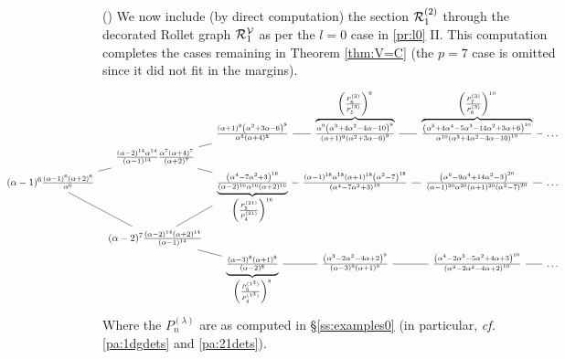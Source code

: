 \documentclass{article}
\newcommand{\ppmm}[1]{#1}  %
\theoremstyle{definition}
\newcommand{\mdef}{\refstepcounter{theorem}       \medskip \noindent ({\bf \thetheorem}) }
\def\a{\alpha}
\def\l{\lambda}
\numberwithin{equation}{subsection}
\begin{document}
\mdef \label{pa:l1}
We now include 
(by direct computation)
the \ppmm{section ${\mathcal{R}}^{(2)}_{1}$ through the }
decorated Rollet graph ${\mathcal{R}}^{{\mathcal V}}_1$ as per the $l=0$ case in \ref{pr:l0} II. This computation completes the cases remaining in Theorem \ref{thm:V=C} (the $p=7$ case is omitted since it did not fit in the margins).
\[
\hspace{-4.51cm} 
\begin{tikzcd}[column sep=0.6em,row sep=0em]
&&&\frac{(\alpha +1)^8 \left(\alpha ^2+3 \alpha -6\right)^8}{\alpha ^8 (\alpha +4)^8}\ar[dash,r]
   &
   \overbrace{
   \tfrac{\alpha ^9 \left(\alpha ^3+4 \alpha ^2-4 \alpha -10\right)^9}{(\alpha +1)^9 \left(\alpha ^2+3 \alpha -6\right)^9}   }^{ \left( \frac{ P^{(3)}_{\ppmm{6}}}{P^{(3)}_{5}} \right)^9}   \ar[dash,r]
   &
   \overbrace{
   \tfrac{\left(\alpha ^5+4 \alpha ^4-5 \alpha ^3-14 \alpha ^2+3 \alpha +6\right)^{10}}{\alpha ^{10} \left(\alpha ^3+4 \alpha ^2-4 \alpha -10\right)^{10}}   }^{  \left( \frac{ P^{(3)}_{\ppmm{7}}}{P^{(3)}_{6}} \right)^{10}  }   \ar[dash,r]
   &\dots
   \\
&&\frac{(\alpha -2)^{14} \alpha ^{14}}{(\alpha -1)^{14}} \frac{\a^7(\alpha +4)^7}{(\alpha +2)^7}\arrow[dash,ur]\arrow[dash,dr]
\\
\alpha ^3\arrow[dash,r] & (\alpha -1)^{6}\frac{(\alpha -1)^{6} (\alpha +2)^6}{\alpha ^6}\arrow[dash,ur]\arrow[dash,dr] 
  &&
  \underbrace{
  \tfrac{\left(\alpha ^4-7 \alpha ^2+3\right)^{16}}{(\alpha -2)^{16} \alpha ^{16} (\alpha +2)^{16}} }_{  \left( \frac{ P^{(21)}_{\ppmm{5}}}{P^{(21)}_{4}} \right)^{16}     } 
    \ar[dash,r]
  &
  \frac{(\alpha -1)^{18} \alpha ^{18} (\alpha +1)^{18} \left(\alpha ^2-7\right)^{18}}{\left(\alpha ^4-7 \alpha ^2+3\right)^{18}}\ar[dash,r]&\frac{\left(\alpha ^6-9 \alpha ^4+14 \alpha ^2-3\right)^{20}}{(\alpha -1)^{20} \alpha ^{20} (\alpha +1)^{20} \left(\alpha ^2-7\right)^{20}}\ar[dash,r]&\dots
\\
&&(\alpha -2)^{7}\frac{(\alpha -2)^{14} (\alpha +2)^{14}}{(\alpha -1)^{14}}\arrow[dash,ur]\arrow[dash,dr]
\\
&&&
  \underbrace{
  \tfrac{(\alpha -3)^8 (\alpha +1)^8}{(\alpha -2)^8} }_{ \left( \frac{ P^{(1^3)}_{\ppmm{5}}}{P^{(1^3)}_{4}} \right)^{8}    }     \ar[dash,r]
  &
  \frac{\left(\alpha ^3-2 \alpha ^2-4 \alpha +2\right)^9}{(\alpha -3)^9 (\alpha +1)^9}\ar[dash,r]&\frac{\left(\alpha ^4-2 \alpha ^3-5 \alpha ^2+4 \alpha +3\right)^{10}}{\left(\alpha ^3-2 \alpha ^2-4 \alpha +2\right)^{10}}\ar[dash,r]&\dots
\end{tikzcd}
\]    
Where the $P_{n}^{(\l)}$ are as computed in \S\ref{ss:examples0} (in particular, \textit{cf.} \ref{pa:1dgdets} and \ref{pa:21dets}).
\end{document}
